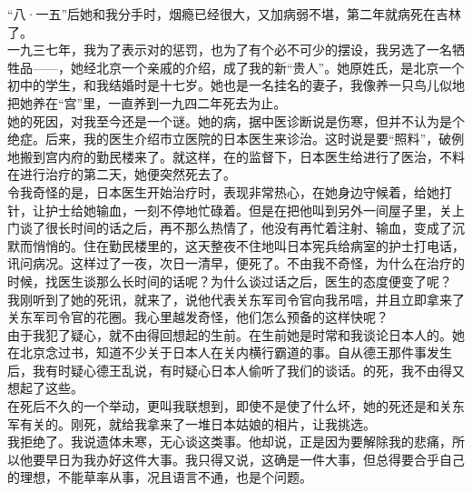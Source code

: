 “八·一五”后她和我分手时，烟瘾已经很大，又加病弱不堪，第二年就病死在吉林了。\\

一九三七年，我为了表示对的惩罚，也为了有个必不可少的摆设，我另选了一名牺牲品——，她经北京一个亲戚的介绍，成了我的新“贵人”。她原姓氏，是北京一个初中的学生，和我结婚时是十七岁。她也是一名挂名的妻子，我像养一只鸟儿似地把她养在“宫”里，一直养到一九四二年死去为止。\\

她的死因，对我至今还是一个谜。她的病，据中医诊断说是伤寒，但并不认为是个绝症。后来，我的医生介绍市立医院的日本医生来诊治。这时说是要“照料”，破例地搬到宫内府的勤民楼来了。就这样，在的监督下，日本医生给进行了医治，不料在进行治疗的第二天，她便突然死去了。\\

令我奇怪的是，日本医生开始治疗时，表现非常热心，在她身边守候着，给她打针，让护士给她输血，一刻不停地忙碌着。但是在把他叫到另外一间屋子里，关上门谈了很长时间的话之后，再不那么热情了，他没有再忙着注射、输血，变成了沉默而悄悄的。住在勤民楼里的，这天整夜不住地叫日本宪兵给病室的护士打电话，讯问病况。这样过了一夜，次日一清早，便死了。不由我不奇怪，为什么在治疗的时候，找医生谈那么长时间的话呢？为什么谈过话之后，医生的态度便变了呢？\\

我刚听到了她的死讯，就来了，说他代表关东军司令官向我吊唁，并且立即拿来了关东军司令官的花圈。我心里越发奇怪，他们怎么预备的这样快呢？\\

由于我犯了疑心，就不由得回想起的生前。在生前她是时常和我谈论日本人的。她在北京念过书，知道不少关于日本人在关内横行霸道的事。自从德王那件事发生后，我有时疑心德王乱说，有时疑心日本人偷听了我们的谈话。的死，我不由得又想起了这些。\\

在死后不久的一个举动，更叫我联想到，即使不是使了什么坏，她的死还是和关东军有关的。刚死，就给我拿来了一堆日本姑娘的相片，让我挑选。\\

我拒绝了。我说遗体未寒，无心谈这类事。他却说，正是因为要解除我的悲痛，所以他要早日为我办好这件大事。我只得又说，这确是一件大事，但总得要合乎自己的理想，不能草率从事，况且语言不通，也是个问题。\\


